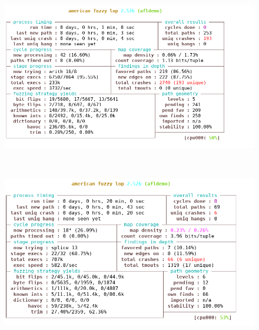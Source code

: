 \documentclass[../main.tex]{subfiles}
\begin{document}
\begin{figure}[htp]
\centering
\begin{minipage}{1.0\textwidth}
  \centering
  \hspace*{0.65cm}
  \includegraphics[scale=0.7]{images/afl-test_x86_64-white.png}
\end{minipage}\\
\begin{minipage}{1.0\textwidth}
  \centering
  \hspace*{0.6cm}
  \includegraphics[scale=0.7]{images/afl-test_qemu.png}
\end{minipage}\\
\end{figure}
\end{document}
